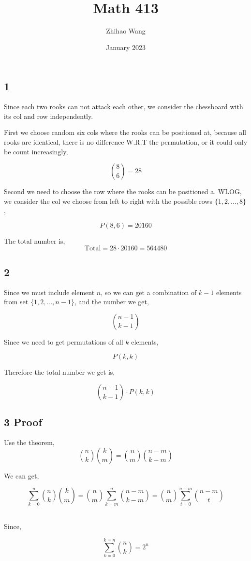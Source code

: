 \documentclass{article}
\title{Math 413}
\author{Zhihao Wang}
\date{January 2023}
\begin{document}
\maketitle

\subsection*{1}
Since each two rooks can not attack each other, we consider the chessboard with its col and row independently.

First we choose random six cols where the rooks can be positioned at, because all rooks are identical, there is no difference W.R.T the permutation, or it could only be count increasingly, 

$${8 \choose 6} = 28$$

Second we need to choose the row where the rooks can be positioned a. WLOG, we consider the col we choose from left to right with the possible rows $\{1, 2, ..., 8 \}$, 

$$P(8, 6) = 20160$$

The total number is,
$$\text{Total} = 28 \cdot 20160 = 564480$$
\subsection*{2}
Since we must include element $n$, so we can get a combination of $k - 1$ elements from set $\{1, 2, ..., n - 1\}$, and the number we get,

$${n - 1 \choose k - 1}$$

Since we need to get permutations of all $k$ elements,

$$P(k, k)$$

Therefore the total number we get is,

$${n - 1 \choose k - 1} \cdot P(k, k)$$

\subsection*{3 Proof}

Use the theorem,
$${n \choose k}{k \choose m} = {n \choose m}{{n - m} \choose {k - m}}$$

We can get,

$$\sum \limits_{k = 0}^{n} {n \choose k}{k \choose m} = {n \choose m} \sum \limits_{k = m}^{n} {{n - m} \choose {k - m}} = {n \choose m} \sum \limits_{t = 0}^{n - m} {{n - m} \choose {t}}$$\

Since,

$$\sum \limits_{k = 0}^{k = n}{n \choose k} = 2^n$$
\end{document}
